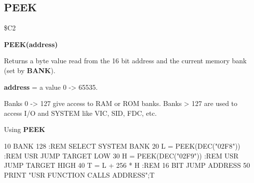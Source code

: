 \subsection{PEEK}
\begin{description}[leftmargin=3cm,style=nextline]
\item [Token:] \$C2
\item [Format:] {\bf PEEK(address)}
\item [Usage:]  Returns a byte value
                read from the 16 bit address and the current
                memory bank (set by {\bf BANK}).

                {\bf address} = a value 0 -> 65535.

\item [Remarks:] Banks 0 -> 127 give access to RAM or ROM banks.
                 Banks > 127 are used to access I/O and SYSTEM
                 like VIC, SID, FDC, etc.
\item [Example:] Using {\bf PEEK}

\begin{screenoutput}
 10 BANK 128                :REM SELECT SYSTEM BANK
 20 L = PEEK(DEC("02F8"))   :REM USR JUMP TARGET LOW
 30 H = PEEK(DEC("02F9"))   :REM USR JUMP TARGET HIGH
 40 T = L + 256 * H         :REM 16 BIT JUMP ADDRESS
 50 PRINT "USR FUNCTION CALLS ADDRESS";T
\end{screenoutput}
\end{description}


\newpage
